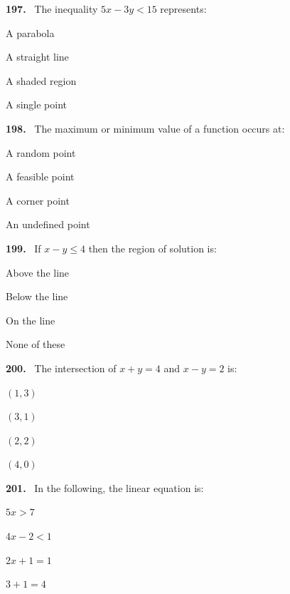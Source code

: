 \documentclass[11pt]{article}
\newenvironment{qenv}[1]{%
  \par\medskip\noindent\textbf{#1.}\ \ignorespaces
}{\par}
\begin{document}
\begin{qenv}{197} The inequality $5x-3y<15$ represents:
\begin{options} \item A parabola \item A straight line \item A shaded region \item A single point \end{options} \end{qenv}

\begin{qenv}{198} The maximum or minimum value of a function occurs at:
\begin{options} \item A random point \item A feasible point \item A corner point \item An undefined point \end{options} \end{qenv}

\begin{qenv}{199} If $x-y \leq 4$ then the region of solution is:
\begin{options} \item Above the line \item Below the line \item On the line \item None of these \end{options} \end{qenv}

\begin{qenv}{200} The intersection of $x+y=4$ and $x-y=2$ is:
\begin{options} \item $(1,3)$ \item $(3,1)$ \item $(2,2)$ \item $(4,0)$ \end{options} \end{qenv}

\begin{qenv}{201} In the following, the linear equation is:
\begin{options} \item $5x>7$ \item $4x-2<1$ \item $2x+1=1$ \item $3+1=4$ \end{options} \end{qenv}
\end{document}
